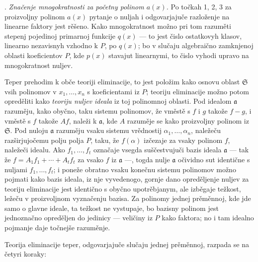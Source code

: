 \documentclass[11pt]{article}
\providecommand{\fraka}{\mathfrak a}
\providecommand{\frakS}{\mathfrak S}
\begin{document}
. \emph{Značenje mnogokratnosti za početny polinom $a(x)$.} Po točkah 1, 2, 3 za proizvoljny polinom $a(x)$ pytanje o nuljah i odgovarjajuče razloženje na linearne faktory jest rěšeno. Kako mnogokratnost možno pri tom razuměti stepenj pojedinoj primarnoj funkcije $q(x)$ --- to jest čislo ostatkovyh klasov, linearno nezavisnyh vzhodno k $P$, po $q(x)$; bo v slučaju algebraično zamknjenoj oblasti koeficientov $P$, kde $p(x)$ stavajut linearnymi, to čislo vyhodi upravo na mnogokratnost nuljev.

Teper prehodim k obče teoriji eliminacije, to jest položim kako osnovu oblast $\frakS$ vsih polinomov v $x_1,\ldots,x_n$ s koeficientami iz $P$; teoriju eliminacije možno potom opreděliti kako \emph{teoriju nuljev ideala} iz toj polinomnoj oblasti. Pod idealom $\fraka$ razuměju, kako obyčno, taku sistemu polinomov, že vměstě s $f$ i $g$ takože $f-g$, i vměstě s $f$ takože $Af$, naleži k $\fraka$, kde $A$ razuměje se kako proizvoljny polinom iz $\frakS$. Pod nuloju $\fraka$ razuměju vsaku sistemu vrědnostij $\alpha_1,\ldots,\alpha_n$, naležeču razširjujočemu polju polja $P$, taku, že $f(\alpha)$ izčezaje za vsaky polinom $f$, naležeči idealu. Ako $f_1,\ldots,f_t$ označaje vsegda suščestvujuči bazis ideala $\fraka$ --- tak že $f=A_1f_1+\cdots+A_tf_t$ za vsako $f$ iz $\fraka$ ---, togda nulje $\fraka$ očividno sut identične s nuljami $f_1,\ldots,f_t$; i poneže obratno vsaku konečnu sistemu polinomov možno pojmati kako bazis ideala, iz nje vyvedenogo, gornje dano opreděljenje nuljev za teoriju eliminacije jest identično s obyčno upotrěbjanym, ale izběgaje težkost, ležeču v proizvoljnom vyznačenju bazisa. Za polinomy jednej prěměnnoj, kde jde samo o glavne ideale, ta težkost ne vystupaje, bo bazisny polinom jest jednoznačno opreděljen do jedinicy --- veličiny iz $P$ kako faktora; no i tam idealno pojmanje daje točnejše razuměnje.

Teorija eliminacije teper, odgovarjajuče slučaju jednej prěměnnoj, razpada se na četyri koraky:
\end{document}
